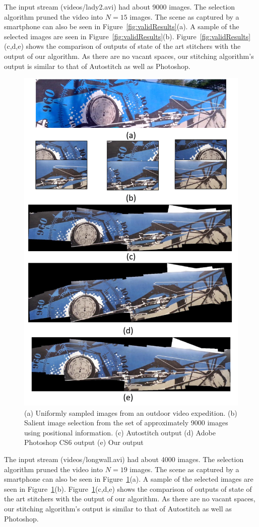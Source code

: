 \documentclass[10pt,twocolumn,letterpaper]{article}
\begin{document}
The input stream (videos/lady2.avi) had about 9000 images. The selection
algorithm pruned the video into $N=15$ images. The scene as captured by a smartphone can also be seen in
Figure~\ref{fig:validResults}(a). A sample of the
selected images are seen in Figure~\ref{fig:validResults}(b).
Figure~\ref{fig:validResults}(c,d,e) shows the comparison of outputs of state
of the art stitchers with the output of our algorithm. As there are no vacant
spaces, our stitching algorithm's output is similar to that of Autostitch as
well as Photoshop.

\begin{figure}[h!]
\centering
\includegraphics[width=0.8\linewidth]{figures/longwall.pdf}
\caption{ (a) Uniformly sampled images from an outdoor video
  expedition.  (b) Salient image selection from the set of
  approximately 9000 images using positional information. (c) Autostitch output
  (d) Adobe Photoshop CS6 output (e) Our output }
\label{fig:validResults1}
\end{figure}

The input stream (videos/longwall.avi) had about 4000 images. The selection
algorithm pruned the video into $N=19$ images.
The scene as captured by a smartphone can also be seen in
Figure~\ref{fig:validResults1}(a). A sample of the
selected images are seen in Figure~\ref{fig:validResults1}(b).
Figure~\ref{fig:validResults1}(c,d,e) shows the comparison of outputs of state
of the art stitchers with the output of our algorithm. As there are no vacant
spaces, our stitching algorithm's output is similar to that of Autostitch as
well as Photoshop.
\end{document}
